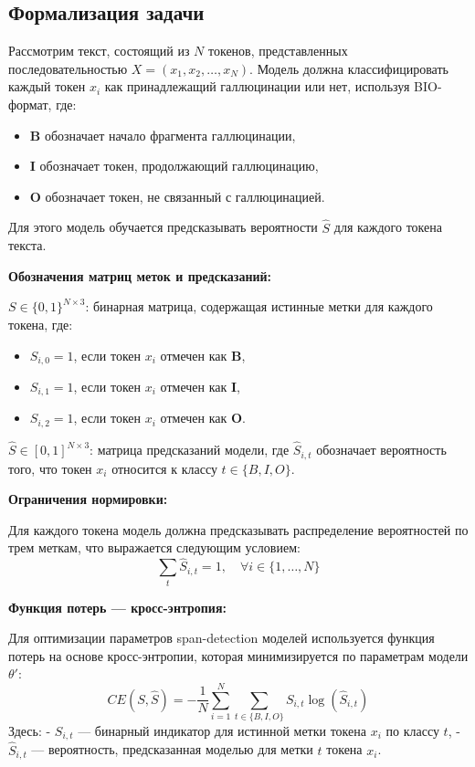 \documentclass[12pt]{article}
\begin{document}
\subsection*{Формализация задачи}

Рассмотрим текст, состоящий из \( N \) токенов, представленных последовательностью \( X = (x_1, x_2, \ldots, x_N) \). Модель должна классифицировать каждый токен \( x_i \) как принадлежащий галлюцинации или нет, используя BIO-формат, где:
\begin{itemize}
\item \textbf{B} обозначает начало фрагмента галлюцинации,
\item \textbf{I} обозначает токен, продолжающий галлюцинацию,
\item \textbf{O} обозначает токен, не связанный с галлюцинацией.
\end{itemize}
Для этого модель обучается предсказывать вероятности \( \hat{S} \) для каждого токена текста.

\textbf{Обозначения матриц меток и предсказаний:}

\( S \in \{0, 1\}^{N \times 3} \): бинарная матрица, содержащая истинные метки для каждого токена, где:
   \begin{itemize}
     \item \( S_{i,0} = 1 \), если токен \( x_i \) отмечен как \textbf{B},
     \item \( S_{i,1} = 1 \), если токен \( x_i \) отмечен как \textbf{I},
     \item \( S_{i,2} = 1 \), если токен \( x_i \) отмечен как \textbf{O}.
   \end{itemize}
\( \hat{S} \in [0, 1]^{N \times 3} \): матрица предсказаний модели, где \( \hat{S}_{i,t} \) обозначает вероятность того, что токен \( x_i \) относится к классу \( t \in \{ B, I, O \} \).

\textbf{Ограничения нормировки:}

   Для каждого токена модель должна предсказывать распределение вероятностей по трем меткам, что выражается следующим условием:
   $$
   \sum_t \hat{S}_{i, t} = 1, \quad \forall i \in \{1, \dots, N\}
   $$

\textbf{Функция потерь — кросс-энтропия:}

   Для оптимизации параметров span-detection моделей используется функция потерь на основе кросс-энтропии, которая минимизируется по параметрам модели \( \theta' \):
   $$
   CE(S, \hat{S}) = -\frac{1}{N} \sum_{i=1}^{N} \sum_{t \in \{B, I, O\}} S_{i, t} \log(\hat{S}_{i, t})
   $$
   Здесь:
   - \( S_{i, t} \) — бинарный индикатор для истинной метки токена \( x_i \) по классу \( t \),
   - \( \hat{S}_{i, t} \) — вероятность, предсказанная моделью для метки \( t \) токена \( x_i \).
\end{document}
